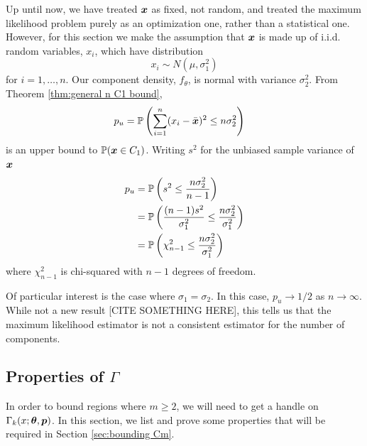 		Up until now, we have treated ${\bm{{x}}}$ as fixed, not random, and treated the maximum likelihood problem purely as an optimization one, rather than a statistical one. However, for this section we make the assumption that ${\bm{{x}}}$ is made up of i.i.d. random variables, $x_i$, which have distribution
		$$x_i \sim N(\mu,\sigma_1^2)$$
		for $i = 1,\dots,n$. Our component density, $f_\theta$, is normal with variance $\sigma_2^2$. From Theorem \ref{thm:general n C1 bound},
		\begin{align*}
		p_u &= \mathbb{P} \left( \sum_{i=1}^n (x_i - \bar{{\bm{{x}}}})^2 \leq n \sigma_2^2  \right)
		\end{align*}
		is an upper bound to $\mathbb{P}({\bm{{x}}} \in C_1)$. Writing $s^2$ for the unbiased sample variance of ${\bm{{x}}}$
		\begin{align*}
		p_u 
		&= \mathbb{P}\left( s^2 \leq \frac{n \sigma_2^2}{n-1}\right)\\
		&= \mathbb{P}\left( \frac{(n-1)s^2}{\sigma_1^2} \leq \frac{n \sigma_2^2}{\sigma_1^2}\right)\\
		&= \mathbb{P}\left(\chi_{n-1}^2  \leq \frac{n \sigma_2^2}{\sigma_1^2} \right)
		\end{align*}
		where $\chi_{n-1}^2$ is chi-squared with $n-1$ degrees of freedom.

		\begin{remark}
			Of particular interest is the case where $\sigma_1 = \sigma_2$. In this case, $p_u \rightarrow 1/2$ as $n \rightarrow \infty$. While not a new result [CITE SOMETHING HERE], this tells us that the maximum likelihood estimator is not a consistent estimator for the number of components.
		\end{remark}


	\subsection{Properties of \texorpdfstring{$\Gamma$}{Gamma}}
		In order to bound regions where $m \geq 2$, we will need to get a handle on $\Gamma_k(x;{\bm{{\theta}}}, {\bm{{p}}})$. In this section, we list and prove some properties that will be required in Section \ref{sec:bounding Cm}.

